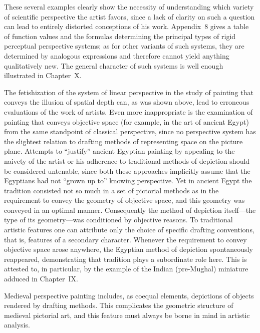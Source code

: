 These several examples clearly show the necessity of understanding which variety of
scientific perspective the artist favors, since a lack of clarity on such a question
can lead to entirely distorted conceptions of his work.  Appendix~8 gives a table of
function values and the formulas determining the principal types of rigid perceptual
perspective systems; as for other variants of such systems, they are determined by
analogous expressions and therefore cannot yield anything qualitatively new.  The
general character of such systems is well enough illustrated in Chapter~X.


The fetishization of the system of linear perspective in the study of painting that
conveys the illusion of spatial depth can, as was shown above, lead to erroneous
evaluations of the work of artists.  Even more inappropriate is the examination of
painting that conveys objective space (for example, in the art of ancient Egypt) from
the same standpoint of classical perspective, since no perspective system has the
slightest relation to drafting methods of representing space on the picture plane.
Attempts to ``justify'' ancient Egyptian painting by appealing to the naivety of the
artist or his adherence to traditional methods of depiction should be considered
untenable, since both these approaches implicitly assume that the Egyptians had not
``grown up to'' knowing perspective.  Yet in ancient Egypt the tradition consisted not
so much in a set of pictorial methods as in the requirement to convey the geometry of
objective space, and this geometry was conveyed in an optimal manner.  Consequently
the method of depiction itself---the type of its geometry---was conditioned by objective
reasons.  To traditional artistic features one can attribute only the choice of specific
drafting conventions, that is, features of a secondary character.  Whenever the
requirement to convey objective space arose anywhere, the Egyptian method of depiction
spontaneously reappeared, demonstrating that tradition plays a subordinate role here.
This is attested to, in particular, by the example of the Indian (pre-Mughal) miniature
adduced in Chapter~IX.

Medieval perspective painting includes, as coequal elements, depictions of objects
rendered by drafting methods.  This complicates the geometric structure of medieval
pictorial art, and this feature must always be borne in mind in artistic analysis.

